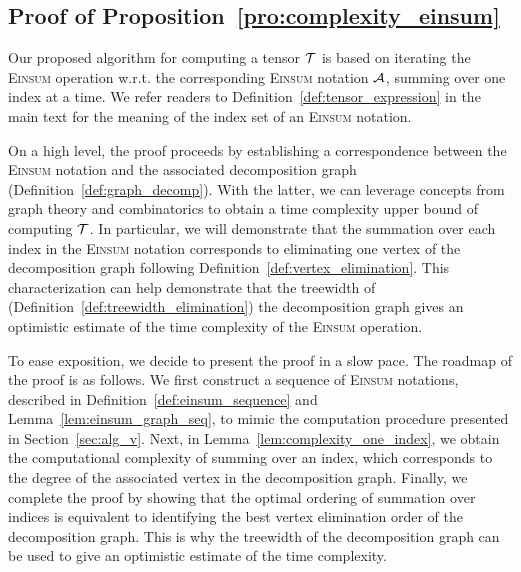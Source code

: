 \documentclass[letterpaper,11pt]{article}
\def\Einsum{\textsc{Einsum}}
\begin{document}
\begin{bibunit}[plainnat]

\section{Proof of Proposition~\ref{pro:complexity_einsum}}
\label{app:complexity_einsum}

Our proposed algorithm for computing a tensor ${\mathcal{T}}$ is based on iterating the \Einsum{} operation w.r.t. the corresponding \Einsum{} notation ${\mathcal{A}}$, summing over one index at a time. We refer readers to Definition~\ref{def:tensor_expression} in the main text for the meaning of the index set of an \Einsum{} notation. 

On a high level, the proof proceeds by establishing a correspondence between the \Einsum{} notation and the associated decomposition graph (Definition~\ref{def:graph_decomp}). With the latter, we can leverage concepts from graph theory and combinatorics to obtain a time complexity upper bound of computing ${\mathcal{T}}$. In particular, we will demonstrate that the summation over each index in the \Einsum{} notation corresponds to eliminating one vertex of the decomposition graph following Definition~\ref{def:vertex_elimination}. This characterization can help demonstrate that the treewidth of (Definition~\ref{def:treewidth_elimination}) the decomposition graph gives an optimistic estimate of the time complexity of the \Einsum{} operation.

To ease exposition, we decide to present the proof in a slow pace. The roadmap of the proof is as follows. We first construct a sequence of \Einsum{} notations, described in Definition~\ref{def:einsum_sequence} and Lemma~\ref{lem:einsum_graph_seq}, to mimic the computation procedure presented in Section~\ref{sec:alg_v}. Next, in Lemma~\ref{lem:complexity_one_index}, we obtain the computational complexity of summing over an index, which corresponds to the degree of the associated vertex in the decomposition graph. Finally, we complete the proof by showing that the optimal ordering of summation over indices is equivalent to identifying the best vertex elimination order of the decomposition graph. This is why the treewidth of the decomposition graph can be used to give an optimistic estimate of the time complexity.



\end{bibunit}
\end{document}

